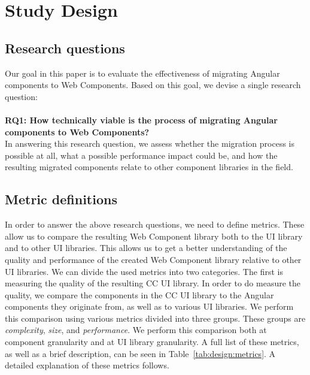 \chapter{Study Design}\label{chap:design}

\section{Research questions}
Our goal in this paper is to evaluate the effectiveness of migrating Angular components to Web Components. Based on this goal, we devise a single research question:
\\
\\
\textbf{RQ1: How technically viable is the process of migrating Angular components to Web Components?}
\\
In answering this research question, we assess whether the migration process is possible at all, what a possible performance impact could be, and how the resulting migrated components relate to other component libraries in the field.
\\

\section{Metric definitions}
In order to answer the above research questions, we need to define metrics. These allow us to compare the resulting Web Component library both to the UI library and to other UI libraries. This allows us to get a better understanding of the quality and performance of the created Web Component library relative to other UI libraries. We can divide the used metrics into two categories. The first is measuring the quality of the resulting CC UI library. In order to do measure the quality, we compare the components in the CC UI library to the Angular components they originate from, as well as to various UI libraries. We perform this comparison using various metrics divided into three groups. These groups are \emph{complexity}, \emph{size}, and \emph{performance}. We perform this comparison both at component granularity and at UI library granularity. A full list of these metrics, as well as a brief description, can be seen in Table~\ref{tab:design:metrics}. A detailed explanation of these metrics follows.


